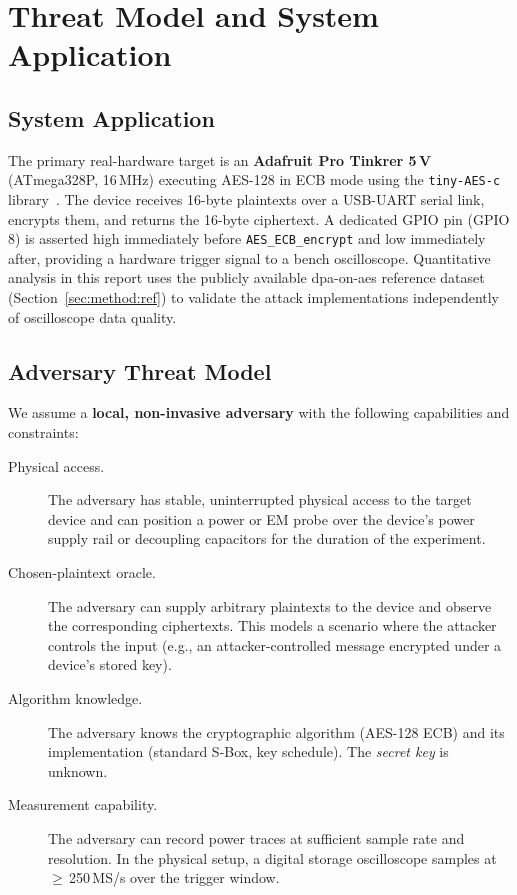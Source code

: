 \section{Threat Model and System Application}
\label{sec:threat}

\subsection{System Application}

The primary real-hardware target is an \textbf{Adafruit Pro Tinkrer 5\,V}
(ATmega328P, 16\,MHz) executing AES-128 in ECB mode using the
\texttt{tiny-AES-c} library~\cite{tinyaes}.
The device receives 16-byte plaintexts over a USB-UART serial link,
encrypts them, and returns the 16-byte ciphertext.
A dedicated GPIO pin (GPIO\,8) is asserted high immediately before
\texttt{AES\_ECB\_encrypt} and low immediately after, providing a
hardware trigger signal to a bench oscilloscope.
Quantitative analysis in this report uses the publicly available
dpa-on-aes reference dataset~\cite{oflynn2015chipwhisperer}
(Section~\ref{sec:method:ref}) to validate the attack implementations
independently of oscilloscope data quality.

\subsection{Adversary Threat Model}

We assume a \textbf{local, non-invasive adversary} with the following
capabilities and constraints:

\begin{description}
  \item[Physical access.] The adversary has stable, uninterrupted physical
    access to the target device and can position a power or EM probe over the
    device's power supply rail or decoupling capacitors for the duration of the
    experiment.

  \item[Chosen-plaintext oracle.] The adversary can supply arbitrary
    plaintexts to the device and observe the corresponding ciphertexts.
    This models a scenario where the attacker controls the input (e.g., an
    attacker-controlled message encrypted under a device's stored key).

  \item[Algorithm knowledge.] The adversary knows the cryptographic algorithm
    (AES-128 ECB) and its implementation (standard S-Box, key schedule).
    The \emph{secret key} is unknown.

  \item[Measurement capability.] The adversary can record power traces at
    sufficient sample rate and resolution.
    In the physical setup, a digital storage oscilloscope samples at
    $\geq$\,250\,MS/s over the trigger window.
\end{description}

